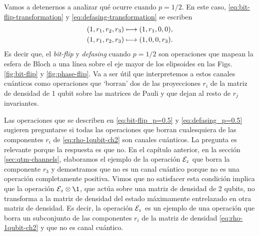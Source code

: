 Vamos a detenernos a analizar qué ocurre cuando $p=1/2$. 
En este caso, \eqref{eq:bit-flip-transformation} y
\eqref{eq:defasing-transformation} se escriben
\begin{align}\label{eq:bit-flip_p=0.5}
\qty(1,r_1,r_2,r_3)&\longmapsto \qty(1,r_1,0,0),\\
\qty(1,r_1,r_2,r_3)&\longmapsto \qty(1,0,0,r_3).\label{eq:defasing_p=0.5}
\end{align}
Es decir que, el \textit{bit-flip} y \textit{defasing} cuando $p=1/2$
son operaciones que mapean la esfera de Bloch a una línea sobre 
el eje mayor de los elipsoides en las Figs. \ref{fig:bit-flip} y \ref{fig:phase-flip}.
Va a ser útil que interpretemos a estos canales cuánticos 
como operaciones que `borran' dos de las proyecciones
$r_i$  de la matriz de densidad de 1 qubit sobre
las matrices de Pauli y que dejan al resto de $r_j$ invariantes.


Las operaciones 	que se describen en \eqref{eq:bit-flip_p=0.5}
y \eqref{eq:defasing_p=0.5} sugieren preguntarse si todas las
operaciones que borran cualesquiera de las componentes $r_i$ 
de \eqref{eq:rho-1qubit-ch2} son canales cuánticos.
La pregunta es relevante porque la respuesta es
que no. En el capítulo anterior, en la sección 
\ref{sec:qtm-channels}, elaboramos el ejemplo de la operación $\mathcal{E}_z$
que borra la componente $r_3$ y demostramos que no es un canal 
cuántico porque no es una operación completamente positiva. 
Vimos que no satisfacer esta condición implica que la operación 
$\E_z\ot\1$, que actúa sobre una matriz de densidad de 2 qubits,
no transforma a la matriz 
de densidad del estado máximamente entrelazado en otra 
matriz de densidad.
Es decir, la operación $\mathcal{E}_z$ es un ejemplo de una 
operación que borra un subconjunto de las componentes $r_i$ de 
la matriz de densidad \eqref{eq:rho-1qubit-ch2} y que no es canal cuántico.

